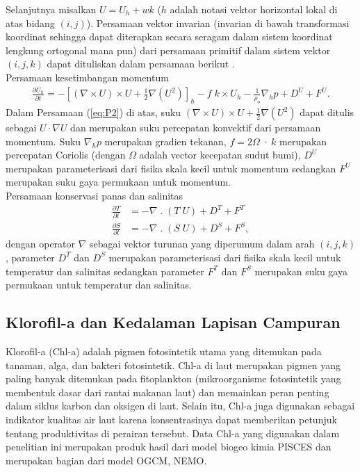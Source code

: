 \begin{spacing}{1.5}
	Selanjutnya misalkan $U = U_h + wk$ ($h$ adalah notasi vektor horizontal lokal di atas bidang $(i,j)$). Persamaan vektor invarian (invarian di bawah transformasi koordinat sehingga dapat diterapkan secara seragam dalam sistem koordinat lengkung ortogonal mana pun) dari persamaan primitif dalam sistem vektor $(i, j, k)$ dapat dituliskan dalam persamaan berikut .\\
	Persamaan kesetimbangan momentum
	\begin{equation}\label{eq:P2}
		\begin{aligned}
			\frac{\partial U_h}{\partial t} = - \left[(\nabla \times U) \times U + \frac{1}{2}\nabla (U^2)\right]_h - f \; k \times U_h - \frac{1}{\rho_o}\nabla_h p + D^U + F^U.
		\end{aligned}
	\end{equation}
	Dalam Persamaan (\ref{eq:P2}) di atas, suku $(\nabla \times U) \times U + \frac{1}{2}\nabla (U^2)$ dapat ditulis sebagai $U\cdot \nabla U$ dan merupakan suku percepatan konvektif dari persamaan momentum. Suku $\nabla_h p$ merupakan gradien tekanan, $f = 2\Omega\; \cdot \;k$ merupakan percepatan Coriolis (dengan $\Omega$ adalah vector kecepatan sudut bumi), $D^U$ merupakan parameterisasi dari fisika skala kecil untuk momentum sedangkan $F^U$ merupakan suku gaya permukaan untuk momentum.\\
	Persamaan konservasi panas dan salinitas
	\begin{equation}\label{eq:P3}
		\begin{aligned}
			\frac{\partial T}{\partial t} &= - \nabla \; . \; (T\;U)  + D^T + F^T \\
			\frac{\partial S}{\partial t} &= - \nabla \; . \; (S\;U)  + D^S + F^S,
		\end{aligned}
	\end{equation}
	dengan operator $\nabla$ sebagai vektor turunan yang diperumum dalam arah $(i,j,k)$, parameter $D^T$ dan $D^S$ merupakan parameterisasi dari fisika skala kecil untuk temperatur dan salinitas sedangkan parameter $F^T$ dan $F^S$ merupakan suku gaya permukaan untuk temperatur dan salinitas. 
	
	\subsection[Klorofil-a dan Kedalaman Lapisan Campuran]{Klorofil-a dan Kedalaman Lapisan Campuran}
	Klorofil-a (Chl-a) adalah pigmen fotosintetik utama yang ditemukan pada tanaman, alga, dan bakteri fotosintetik. Chl-a di laut merupakan pigmen yang paling banyak ditemukan pada fitoplankton (mikroorganisme fotosintetik yang membentuk dasar dari rantai makanan laut) dan memainkan peran penting dalam siklus karbon dan oksigen di laut. Selain itu, Chl-a juga digunakan sebagai indikator kualitas air laut karena konsentrasinya dapat memberikan petunjuk tentang produktivitas di perairan tersebut. Data Chl-a yang digunakan dalam penelitian ini merupakan produk hasil dari model biogeo kimia PISCES \cite{gmd-8-2465-2015} dan merupakan bagian dari model OGCM, NEMO. 
	

\end{spacing}
